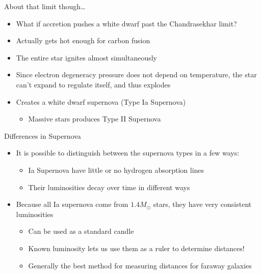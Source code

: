 \documentclass[pdf,aspectratio=169]{beamer}
\begin{document}
\begin{frame}{About that limit though\ldots}
  \begin{itemize}
	\item What if accretion pushes a white dwarf past the Chandrasekhar limit?
	\item Actually gets hot enough for carbon fusion
	\item The entire star ignites almost simultaneously
	\item Since electron degeneracy pressure does not depend on temperature, the star can't expand to regulate itself, and thus explodes
	\item Creates a white dwarf supernova (Type Ia Supernova)
	  \begin{itemize}
		\item Massive stars produces Type II Supernova
	  \end{itemize}
  \end{itemize}
\end{frame}

\begin{frame}{Differences in Supernova}
  \begin{itemize}
	\item It is possible to distinguish between the supernova types in a few ways:
	  \begin{itemize}
		\item Ia Supernova have little or no hydrogen absorption lines
		\item Their luminosities decay over time in different ways
	  \end{itemize}
	\item Because all Ia supernova come from $1.4M_\odot$ stars, they have very consistent luminosities
	  \begin{itemize}
		\item Can be used as a \alert{standard candle}
		\item Known luminosity lets us use them as a ruler to determine distances!
		\item Generally the best method for measuring distances for faraway galaxies
	  \end{itemize}
  \end{itemize}
\end{frame}

\end{document}
